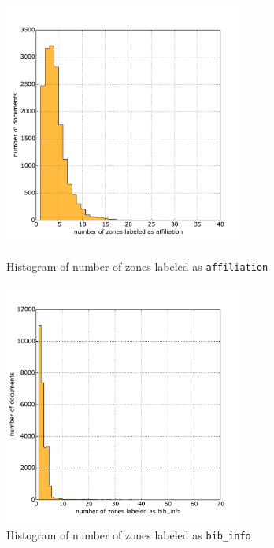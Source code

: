 \begin{appendix}
\begin{figure}
\centering
\begin{minipage}[t!]{0.48\linewidth}
  \includegraphics[width=8cm]{plots/affiliation_histogram}
  \caption{Histogram of number of zones labeled as \texttt{affiliation}}
  \label{fig:affiliation_histogram}
\end{minipage}
\quad
\begin{minipage}[t!]{0.48\linewidth}
  \includegraphics[width=8cm]{plots/bib_info_histogram}
  \caption{Histogram of number of zones labeled as \texttt{bib\_info}}
  \label{fig:bib_info_histogram}
\end{minipage}
\end{figure}


\end{appendix}
